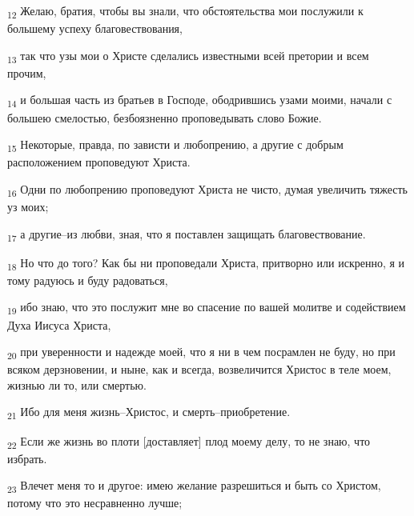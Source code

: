 \begin{tcolorbox}
\textsubscript{12} Желаю, братия, чтобы вы знали, что обстоятельства мои послужили к большему успеху благовествования,
\end{tcolorbox}
\begin{tcolorbox}
\textsubscript{13} так что узы мои о Христе сделались известными всей претории и всем прочим,
\end{tcolorbox}
\begin{tcolorbox}
\textsubscript{14} и большая часть из братьев в Господе, ободрившись узами моими, начали с большею смелостью, безбоязненно проповедывать слово Божие.
\end{tcolorbox}
\begin{tcolorbox}
\textsubscript{15} Некоторые, правда, по зависти и любопрению, а другие с добрым расположением проповедуют Христа.
\end{tcolorbox}
\begin{tcolorbox}
\textsubscript{16} Одни по любопрению проповедуют Христа не чисто, думая увеличить тяжесть уз моих;
\end{tcolorbox}
\begin{tcolorbox}
\textsubscript{17} а другие--из любви, зная, что я поставлен защищать благовествование.
\end{tcolorbox}
\begin{tcolorbox}
\textsubscript{18} Но что до того? Как бы ни проповедали Христа, притворно или искренно, я и тому радуюсь и буду радоваться,
\end{tcolorbox}
\begin{tcolorbox}
\textsubscript{19} ибо знаю, что это послужит мне во спасение по вашей молитве и содействием Духа Иисуса Христа,
\end{tcolorbox}
\begin{tcolorbox}
\textsubscript{20} при уверенности и надежде моей, что я ни в чем посрамлен не буду, но при всяком дерзновении, и ныне, как и всегда, возвеличится Христос в теле моем, жизнью ли то, или смертью.
\end{tcolorbox}
\begin{tcolorbox}
\textsubscript{21} Ибо для меня жизнь--Христос, и смерть--приобретение.
\end{tcolorbox}
\begin{tcolorbox}
\textsubscript{22} Если же жизнь во плоти [доставляет] плод моему делу, то не знаю, что избрать.
\end{tcolorbox}
\begin{tcolorbox}
\textsubscript{23} Влечет меня то и другое: имею желание разрешиться и быть со Христом, потому что это несравненно лучше;
\end{tcolorbox}
